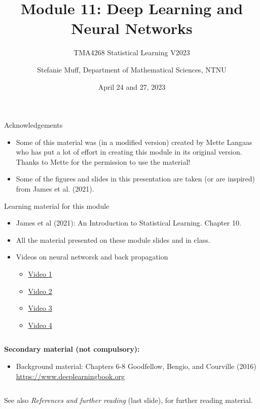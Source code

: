 \documentclass[
  10pt,
  ignorenonframetext,
]{beamer}
\title{Module 11: Deep Learning and Neural Networks}
\subtitle{TMA4268 Statistical Learning V2023}
\author{Stefanie Muff, Department of Mathematical Sciences, NTNU}
\date{April 24 and 27, 2023}
\providecommand{\tightlist}{%
  \setlength{\itemsep}{0pt}\setlength{\parskip}{0pt}}
\begin{document}
\frame{\titlepage}

\begin{frame}{Acknowledgements}
\protect\hypertarget{acknowledgements}{}
\(~\)

\begin{itemize}
\item
  Some of this material was (in a modified version) created by Mette
  Langaas who has put a lot of effort in creating this module in its
  original version. Thanks to Mette for the permission to use the
  material!
\item
  Some of the figures and slides in this presentation are taken (or are
  inspired) from James et al. (2021).
\end{itemize}
\end{frame}

\begin{frame}
\begin{block}{Learning material for this module}
\protect\hypertarget{learning-material-for-this-module}{}
\vspace{2mm}

\begin{itemize}
\item
  James et al (2021): An Introduction to Statistical Learning. Chapter
  10.
\item
  All the material presented on these module slides and in class.
\item
  Videos on neural networsk and back propagation

  \begin{itemize}
  \tightlist
  \item
    \href{https://www.youtube.com/watch?v=aircAruvnKk}{Video 1}
  \item
    \href{https://www.youtube.com/watch?v=IHZwWFHWa-w}{Video 2}
  \item
    \href{https://www.youtube.com/watch?v=Ilg3gGewQ5U}{Video 3}
  \item
    \href{https://www.youtube.com/watch?v=tIeHLnjs5U8}{Video 4}
  \end{itemize}
\end{itemize}

\(~\)

\textbf{Secondary material (not compulsory):}

\vspace{2mm}

\begin{itemize}
\tightlist
\item
  Background material: Chapters 6-8 Goodfellow, Bengio, and Courville
  (2016) \url{https://www.deeplearningbook.org}
\end{itemize}

\(~\)

See also \emph{References and further reading} (last slide), for further
reading material.
\end{block}
\end{frame}
\end{document}
